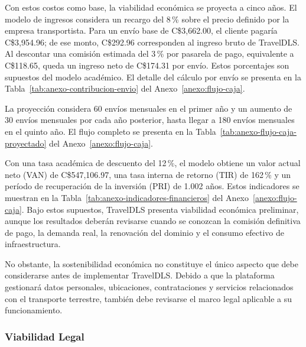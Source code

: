 Con estos costos como base, la viabilidad económica se proyecta a cinco años. El modelo de ingresos considera un recargo del 8\,\% sobre el precio definido por la empresa transportista. Para un envío base de C\$3,662.00, el cliente pagaría C\$3,954.96; de ese monto, C\$292.96 corresponden al ingreso bruto de TravelDLS. Al descontar una comisión estimada del 3\,\% por pasarela de pago, equivalente a C\$118.65, queda un ingreso neto de C\$174.31 por envío. Estos porcentajes son supuestos del modelo académico. El detalle del cálculo por envío se presenta en la Tabla~\ref{tab:anexo-contribucion-envio} del Anexo~\ref{anexo:flujo-caja}.

La proyección considera 60 envíos mensuales en el primer año y un aumento de 30 envíos mensuales por cada año posterior, hasta llegar a 180 envíos mensuales en el quinto año. El flujo completo se presenta en la Tabla~\ref{tab:anexo-flujo-caja-proyectado} del Anexo~\ref{anexo:flujo-caja}.

Con una tasa académica de descuento del 12\,\%, el modelo obtiene un valor actual neto (VAN) de C\$547,106.97, una tasa interna de retorno (TIR) de 162\,\% y un período de recuperación de la inversión (PRI) de 1.002 años. Estos indicadores se muestran en la Tabla~\ref{tab:anexo-indicadores-financieros} del Anexo~\ref{anexo:flujo-caja}. Bajo estos supuestos, TravelDLS presenta viabilidad económica preliminar, aunque los resultados deberán revisarse cuando se conozcan la comisión definitiva de pago, la demanda real, la renovación del dominio y el consumo efectivo de infraestructura.

No obstante, la sostenibilidad económica no constituye el único aspecto que debe considerarse antes de implementar TravelDLS. Debido a que la plataforma gestionará datos personales, ubicaciones, contrataciones y servicios relacionados con el transporte terrestre, también debe revisarse el marco legal aplicable a su funcionamiento.

\subsubsection{Viabilidad Legal}
\label{sec:viabilidad-legal}

